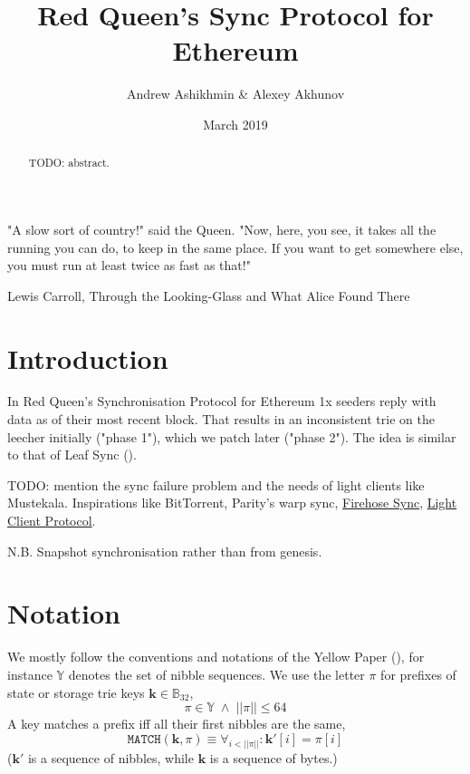 \documentclass{amsart}
\begin{document}
\pagecolor{white}

\title{Red Queen's Sync Protocol for Ethereum}
\author{Andrew Ashikhmin \& Alexey Akhunov}
\date{March 2019}

\begin{abstract}
TODO: abstract.
\end{abstract}

\maketitle

\epigraph{
    "A slow sort of country!" said the Queen.
    "Now, here, you see, it takes all the running you can do, to keep in the same place.
    If you want to get somewhere else, you must run at least twice as fast as that!"
    }{Lewis Carroll, Through the Looking-Glass and What Alice Found There}

\section{Introduction}

In Red Queen's Synchronisation Protocol for Ethereum 1x seeders reply with data as of their most recent block.
That results in an inconsistent trie on the leecher initially ("phase 1"), which we patch later ("phase 2").
The idea is similar to that of Leaf Sync (\cite{leaf_sync}).

TODO: mention the sync failure problem \cite{akhunov_1x_workshop_part1} and the needs of light clients like Mustekala.
Inspirations like BitTorrent, Parity's warp sync,
\href{https://notes.ethereum.org/eXnqtO_vQquzrFDPHjuaFQ}{Firehose Sync},
\href{https://github.com/ethereum/wiki/wiki/Light-client-protocol}{Light Client Protocol}.

N.B. Snapshot synchronisation rather than from genesis.



\section{Notation}

We mostly follow the conventions and notations of the Yellow Paper (\cite{yellow_paper}),
for instance $\mathbb{Y}$ denotes the set of nibble sequences.
We use the letter $\pi$ for prefixes of state or storage trie keys $\mathbf{k} \in \mathbb{B}_{32}$,
\begin{equation}
    \pi \in \mathbb{Y} \; \land \; ||\pi|| \leq 64
\end{equation}
A key matches a prefix iff all their first nibbles are the same,
\begin{equation}
    \texttt{MATCH}(\mathbf{k}, \pi) \equiv \forall_{i < ||\pi||}: \mathbf{k}'[i] = \pi[i]
\end{equation}
($\mathbf{k}'$ is a sequence of nibbles, while $\mathbf{k}$ is a sequence of bytes.)
\end{document}

